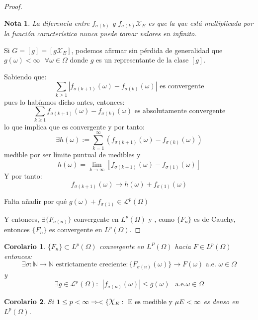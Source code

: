 \documentclass[11pt, a4paper]{article}
\DeclareRobustCommand{\rchi}{{\Large \mathpalette\irchi\relax}}
\newcommand{\irchi}[2]{\raisebox{0.6\depth}{$#1\chi$}} %
\theoremstyle{theorem-style}
\newtheorem{ncor}{Corolario}[section]
\theoremstyle{definition-style}
\theoremstyle{remark-style}
\newtheorem*{nota}{Nota}
\theoremstyle{example-style}
\begin{document}
\begin{proof}
  \begin{nota}
    La diferencia entre  $f_{\sigma(k)}$ y $f_{\sigma(k)}\mathcal X _E$ es que la que está multiplicada por la función característica nunca puede tomar valores en infinito.
  \end{nota}
  
  Si $G = [g] = [g \mathcal X _E]$, podemos afirmar sin pérdida de generalidad que $g(\omega) < \infty \ \ \ \forall \omega \in \Omega$ donde $g$ es un representante de la clase $[g]$.
  
  Sabiendo que:
  \[
    \sum_{k \geq 1} |f_{\sigma(k+1)}(\omega) - f_{\sigma(k)}(\omega)| \text{ es convergente}
  \]	
  pues lo habíamos dicho antes, entonces:
  \[
    \sum_{k \geq 1} f_{\sigma(k+1)}(\omega) - f_{\sigma(k)}(\omega) \text{ es absolutamente convergente}
  \]
  lo que implica que es convergente y por tanto:
  \[
    \exists h(\omega):= \sum_{k=1}^\infty (f_{\sigma(k+1)}(\omega) - f_{\sigma(k)}(\omega))
  \]
  medible por ser límite puntual de medibles y 
  \[
    h(\omega) = \lim_{k \to \infty}[f_{\sigma(k+1)}(\omega) -f_{\sigma(1)}(\omega)]
  \]
  Y por tanto:
  \[
    f_{\sigma(k+1)}(\omega) \to h(\omega) + f_{\sigma(1)}(\omega)
  \]
  
  Falta añadir por qué $g(\omega) + f_{\sigma(1)} \in \mathcal L ^p (\Omega)$
  
  
  
  
  Y entonces, $\exists \{ F_{\sigma(n)}\}$ convergente en $L^p(\Omega)$ y , como $\{F_n\}$ es de Cauchy, entonces $\{F_n\}$ es convergente en $L^p(\Omega)$.
\end{proof}


\begin{ncor} \label{jose}
  $\{F_n\} \subset  L ^p (\Omega)$ convergente en $L^P(\Omega)$ hacia $F \in L^p(\Omega)$ entonces:
  \[
    \exists \sigma : \mathbb N \to \mathbb N \text{ estrictamente creciente} : \{F_{\sigma(n)}(\omega)\}\to F(\omega) \text{ a.e. } \omega \in \Omega
  \]
  y
  \[
    \exists \bar g \in \mathcal L ^p (\Omega) : \ \ |f_{\sigma(n)}(\omega)| \leq \bar g (\omega) \ \ \text{ a.e.} \omega \in \Omega
  \]
\end{ncor}

\begin{ncor}
  Si $1 \leq p < \infty \Rightarrow < \{\rchi_{E} : \text{ E es medible y } \mu{E} < \infty$ es denso en $L^{p}(\Omega)$.
\end{ncor}
\end{document}
